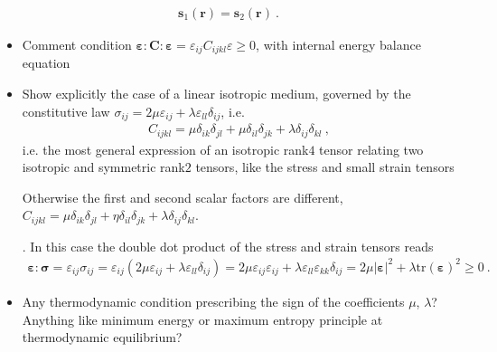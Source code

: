 \documentclass[letterpaper,10pt,english]{jupyterBook}
\begin{document}
\begin{equation*}
\begin{split}\mathbf{s}_1(\mathbf{r}) = \mathbf{s}_2(\mathbf{r}) \ .\end{split}
\end{equation*}
\sphinxAtStartPar
{}
\begin{itemize}
\item {} 
\sphinxAtStartPar
{} Comment condition \(\boldsymbol\varepsilon : \mathbf{C} : \boldsymbol\varepsilon = \varepsilon_{ij} C_{ijkl} \varepsilon \ge 0\), with internal energy balance equation

\item {} 
\sphinxAtStartPar
Show explicitly the case of a linear isotropic medium, governed by the constitutive law \(\sigma_{ij} = 2 \mu \varepsilon_{ij} + \lambda \varepsilon_{ll} \delta_{ij}\), i.e.
\begin{equation*}
\begin{split}C_{ijkl} = \mu \delta_{ik} \delta_{jl} + \mu \delta_{il} \delta_{jk} + \lambda \delta_{ij} \delta_{kl} \ ,\end{split}
\end{equation*}
\sphinxAtStartPar
i.e. the most general expression of an isotropic rank\sphinxhyphen{}\(4\) tensor relating two isotropic and symmetric rank\sphinxhyphen{}\(2\) tensors, like the stress and small strain tensors%
\begin{footnote}[2]\sphinxAtStartFootnote
Otherwise the first and second scalar factors are different, \(C_{ijkl} = \mu \delta_{ik} \delta_{jl} + \eta \delta_{il} \delta_{jk} + \lambda \delta_{ij} \delta_{kl}\).
%
\end{footnote}. In this case the double dot product of the stress and strain tensors reads
\begin{equation*}
\begin{split}\boldsymbol\varepsilon : \boldsymbol\sigma = \varepsilon_{ij} \sigma_{ij} = \varepsilon_{ij} \left( 2 \mu \varepsilon_{ij} + \lambda \varepsilon_{ll} \delta_{ij}  \right) = 2 \mu \varepsilon_{ij} \varepsilon_{ij} + \lambda \varepsilon_{ll} \varepsilon_{kk} \delta_{ij} = 2 \mu |\boldsymbol\varepsilon|^2 + \lambda \text{tr}\left(\boldsymbol\varepsilon\right)^2 \ge 0 \ .\end{split}
\end{equation*}
\end{itemize}
\begin{itemize}
\item {} 
\sphinxAtStartPar
{} Any thermodynamic condition prescribing the sign of the coefficients \(\mu\), \(\lambda\)? Anything like minimum energy or maximum entropy principle at thermodynamic equilibrium?

\end{itemize}
\end{document}
